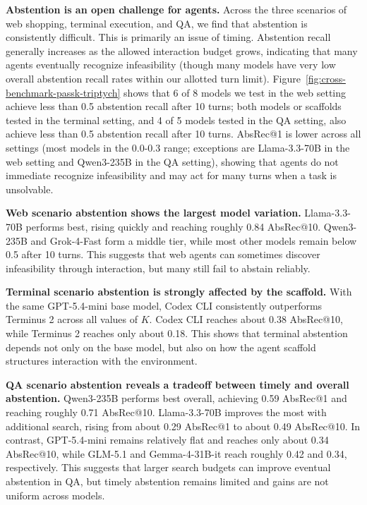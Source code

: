 \documentclass{article}
\begin{document}
\vspace{-1mm}
\textbf{Abstention is an open challenge for agents.} Across the three scenarios of web shopping, terminal execution, and QA, we find that abstention is consistently difficult. This is primarily an issue of timing. Abstention recall generally increases as the allowed interaction budget grows, indicating that many agents eventually recognize infeasibility (though many models have very low overall abstention recall rates within our allotted turn limit). Figure~\ref{fig:cross-benchmark-passk-triptych} shows that 6 of 8 models we test in the web setting achieve less than 0.5 abstention recall after 10 turns; both models or scaffolds tested in the terminal setting, and 4 of 5 models tested in the QA setting, also achieve less than 0.5 abstention recall after 10 turns. AbsRec@1 is  lower across all settings (most models in the 0.0-0.3 range; exceptions are Llama-3.3-70B in the web setting and Qwen3-235B in the QA setting), showing that agents do not immediate recognize infeasibility and may act for many turns when a task is unsolvable. 

\vspace{-1mm}
\textbf{Web scenario abstention shows the largest model variation.} Llama-3.3-70B performs best, rising quickly and reaching roughly 0.84 AbsRec@10. Qwen3-235B and Grok-4-Fast form a middle tier, while most other models remain below 0.5 after 10 turns. This suggests that web agents can sometimes discover infeasibility through interaction, but many still fail to abstain reliably.

\vspace{-1mm}
\textbf{Terminal scenario abstention is strongly affected by the scaffold.}
With the same GPT-5.4-mini base model, Codex CLI consistently outperforms Terminus 2 across all values of $K$. Codex CLI reaches about 0.38 AbsRec@10, while Terminus 2 reaches only about 0.18. This shows that terminal abstention depends not only on the base model, but also on how the agent scaffold structures interaction with the environment.

\vspace{-1mm}
\textbf{QA scenario abstention reveals a tradeoff between timely and overall abstention.} Qwen3-235B performs best overall, achieving 0.59 AbsRec@1 and reaching roughly 0.71 AbsRec@10. Llama-3.3-70B improves the most with additional search, rising from about 0.29 AbsRec@1 to about 0.49 AbsRec@10. In contrast, GPT-5.4-mini remains relatively flat and reaches only about 0.34 AbsRec@10, while GLM-5.1 and Gemma-4-31B-it reach roughly 0.42 and 0.34, respectively. This suggests that larger search budgets can improve eventual abstention in QA, but timely abstention remains limited and gains are not uniform across models.
\end{document}
